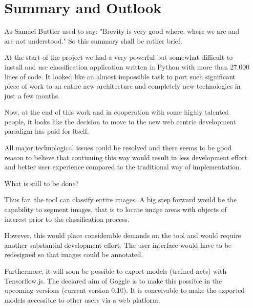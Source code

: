 \chapter{Summary and Outlook}

As Samuel Buttler used to say: "Brevity is very good where,
where we are and are not understood." So this summary shall be rather brief.

At the start of the project we had a very powerful but
somewhat difficult to install and use classification
 application written in Python with more than 27.000 lines of code. 
It looked like
an almost impossible task to port such significant piece of
work to an entire new architecture and completely new technologies in just a few months.

Now, at the end of this work and in cooperation with some 
highly talented people, it looks like the decision to
 move to the new web centric development paradigm has 
 paid for itself.

All major technological issues could be resolved and there seems to be good reason to believe that continuing this way
would result in less development effort and better user
experience compared to the traditional way of
implementation.

What is still to be done?

Thus far, the tool can classify entire images. A big step forward would be the capability to segment images, 
that is to locate image areas with objects of interest
prior to the classification process. 

However, this would place considerable demands on the tool and would
require another substantial development effort. The user interface would have to be redesigned so that 
images could be annotated.  

Furthermore, it will soon be possible to export models (trained nets) with Tensorflow.js. The declared aim of Goggle is to make this possible in the upcoming versions (current version 0.10). It is conceivable to make the exported models accessible to other users via a web platform. 
